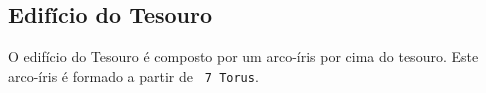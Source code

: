 

\subsection{Edifício do Tesouro}

	O edifício do Tesouro é composto por um arco-íris por cima do tesouro. Este arco-íris é 
formado a partir de \verb+ 7 Torus+.